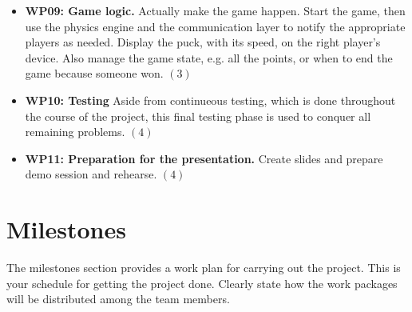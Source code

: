 \documentclass{report}
\begin{document}
\begin{itemize}
	\item {\bf WP09: Game logic.} Actually make the game happen. Start the game, then use the physics engine and the communication layer to notify the appropriate players as needed. Display the puck, with its speed, on the right player's device. Also manage the game state, e.g. all the points, or when to end the game because someone won. $(3)$

         \item {\bf WP10:  Testing} Aside from continueous testing, which is done throughout the course of the project, this final testing phase is used to conquer all remaining problems. $(4)$
         
         \item {\bf WP11: Preparation for the presentation.} Create slides and prepare demo session and rehearse. $(4)$
         
\end{itemize}
 
\section{Milestones}
The milestones section provides a work plan for carrying out the project.
This is your schedule for getting the project done.
Clearly state how the work packages will be distributed among the team members. 


\end{document}
